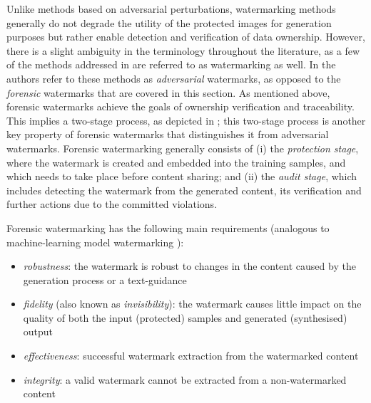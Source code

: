 \documentclass[conference,table]{IEEEtran}
\begin{document}
Unlike methods based on adversarial perturbations, watermarking methods generally do not degrade the utility of the protected images for generation purposes but rather enable detection and verification of data ownership. 
However, there is a slight ambiguity in the terminology throughout the literature, as a few of the methods addressed in  are referred to as watermarking as well. 
In \cite{zhang_editguard_2023} the authors refer to these methods as \textit{adversarial} watermarks, as opposed to the \textit{forensic} watermarks that are covered in this section. 
As mentioned above, forensic watermarks achieve the goals of ownership verification and traceability. 
This implies a two-stage process, as depicted in ; this two-stage process is another key property of forensic watermarks that distinguishes it from adversarial watermarks.
Forensic watermarking generally consists of (i) the \textit{protection stage}, where the watermark is created and embedded into the training samples, and which needs to take place before content sharing; and (ii) the \textit{audit stage}, which includes detecting the watermark from the generated content, its verification and further actions due to the committed violations. 

Forensic watermarking has the following main requirements (analogous to machine-learning model watermarking \cite{lederer_identifying_2023}):
\begin{itemize}
    \item \textit{robustness}: the watermark is robust to changes in the content caused by the generation process or a text-guidance
    \item \textit{fidelity} (also known as \textit{invisibility}): the watermark causes little impact on the quality of both the input (protected) samples and generated (synthesised) output
    \item \textit{effectiveness}: successful watermark extraction from the watermarked content
    \item \textit{integrity}: a valid watermark cannot be extracted from a non-watermarked content
\end{itemize}
\end{document}
